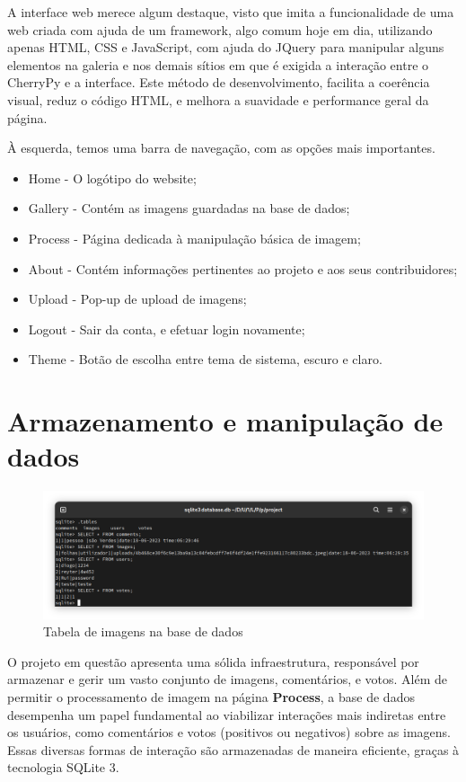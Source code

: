 \documentclass{report}
\begin{document}
A interface web merece algum destaque, visto que imita a funcionalidade de uma web criada com ajuda de um framework, algo comum hoje em dia, utilizando apenas HTML, CSS e JavaScript, com ajuda do JQuery para manipular alguns elementos na galeria e nos demais sítios em que é exigida a interação entre o CherryPy e a interface. Este método de desenvolvimento, facilita a coerência visual, reduz o código HTML, e melhora a suavidade e performance geral da página.

À esquerda, temos uma barra de navegação, com as opções mais importantes.

\begin{itemize}
    \item Home - O logótipo do website;
    \item Gallery - Contém as imagens guardadas na base de dados;
    \item Process - Página dedicada à manipulação básica de imagem;
    \item About - Contém informações pertinentes ao projeto e aos seus contribuidores;
    \item Upload - Pop-up de upload de imagens;
    \item Logout - Sair da conta, e efetuar login novamente;
    \item Theme - Botão de escolha entre tema de sistema, escuro e claro.
\end{itemize}

\chapter{Armazenamento e manipulação de dados}
\label{chap.dados}

\begin{figure}[htbp]
  \centering
  \includegraphics[width=\textwidth]{database.png}
  \caption{Tabela de imagens na base de dados}
  \label{fig:image}
\end{figure}

O projeto em questão apresenta uma sólida infraestrutura, responsável por armazenar e gerir um vasto conjunto de imagens, comentários, e votos. Além de permitir o processamento de imagem na página \textbf{Process}, a base de dados desempenha um papel fundamental ao viabilizar interações mais indiretas entre os usuários, como comentários e votos (positivos ou negativos) sobre as imagens. Essas diversas formas de interação são armazenadas de maneira eficiente, graças à tecnologia SQLite 3.
\end{document}

